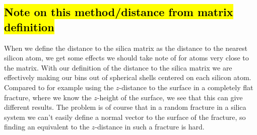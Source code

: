 \subsection[Note on this method]{\hl{Note on this method/distance from matrix definition}}
When we define the distance to the silica matrix as the distance to the nearest silicon atom, we get some effects we should take note of for atoms very close to the matrix. With our definition of the distance to the silica matrix we are effectively making our bins out of spherical shells centered on each silicon atom. Compared to for example using the $z$-distance to the surface in a completely flat fracture, where we know the $z$-height of the surface, we see that this can give different results. The problem is of course that in a random fracture in a silica system we can't easily define a normal vector to the surface of the fracture, so finding an equivalent to the $z$-distance in such a fracture is hard.

